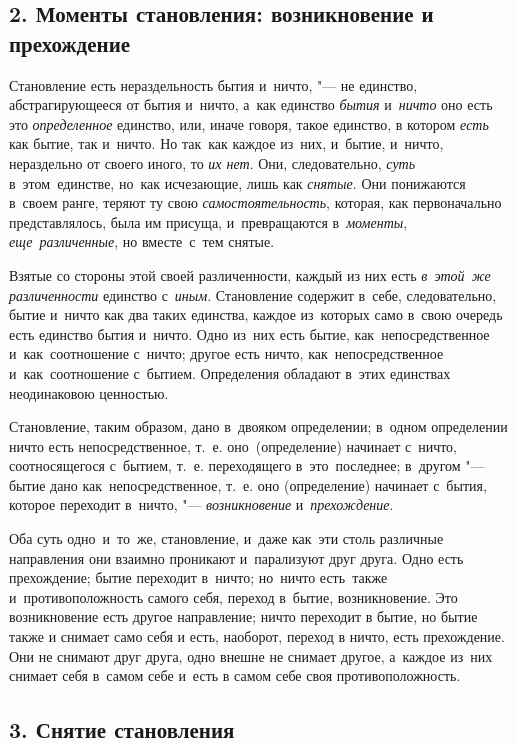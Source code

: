 \subsection[2. Моменты становления: возникновение и прехождение]{2. Моменты становления: возникновение и прехождение}

Становление есть нераздельность бытия и~ничто, "---
не единство, абстрагирующееся от бытия и~ничто, а~как единство
{\em бытия} и~{\em ничто} оно есть
это {\em определенное} единство, или, иначе говоря,
такое единство, в котором {\em есть} как бытие, так и~ничто.
Но так~как каждое из~них, и~бытие, и~ничто, нераздельно от своего
иного, то {\em их нет}. Они, следовательно,
{\em суть} в~этом~единстве, но~как исчезающие, лишь как
{\em снятые}. Они понижаются в~своем ранге, теряют ту
свою {\em самостоятельность}, которая, как
первоначально представлялось, была им присуща, и~превращаются
в~{\em моменты}, {\em еще~различенные}, но вместе~с~тем снятые.

Взятые со стороны этой своей различенности, каждый из них есть
{\em в~этой~же различенности} единство с~{\em иным}.
Становление содержит в~себе, следовательно, бытие
и~ничто как два таких единства, каждое из~которых само
в~свою очередь есть единство бытия и~ничто. Одно из~них есть бытие,
как~непосредственное и~как~соотношение с~ничто; другое есть ничто,
как~непосредственное и~как~соотношение с~бытием. Определения обладают
в~этих единствах неодинаковою ценностью.

Становление, таким образом, дано в~двояком определении; в~одном определении
ничто есть непосредственное, т.~е. оно~(определение) начинает с~ничто,
соотносящегося с~бытием, т.~е. переходящего в~это~последнее; в~другом
"--- бытие дано как~непосредственное, т.~е. оно (определение) начинает
с~бытия, которое переходит в~ничто, "--- {\em возникновение}
и~{\em прехождение}.

Оба суть одно~и~то~же, становление, и~даже как~эти столь различные
направления они взаимно проникают и~парализуют друг друга. Одно есть
прехождение; бытие переходит в~ничто; но~ничто есть~также
и~противоположность самого себя, переход в~бытие, возникновение. Это
возникновение есть другое направление; ничто переходит в бытие, но бытие
также и снимает само себя и есть, наоборот, переход в ничто, есть
прехождение. Они не снимают друг друга, одно внешне не снимает другое,
а~каждое из~них снимает себя в~самом себе и~есть в самом себе
своя противоположность.

\subsection[3. Снятие становления]{3. Снятие становления}


